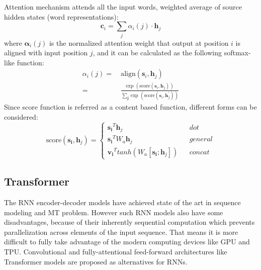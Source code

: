 Attention mechanism attends all the input words, weighted average of source hidden states (word representations):
\[ \bm{c}_i = \sum_{j} {\alpha}_i(j)\cdot  \bm{h}_j \]
where $\bm{\alpha}_i(j)$ is the normalized attention weight that output at position $i$ is aligned with input position $j$, and it can be calculated as the following softmax-like function:
\begin{align}
{\alpha}_i(j) = & \ \text{align}(\bm{s}_i, {\bm{h}}_j) \\
= & \ \frac{\text{exp\ }(\text{score}(\bm{s}_i, {\bm{h}}_j))}{\sum_{\bm{j}^{\prime}} \text{exp\ }(\text{score}(\bm{s}_i, {\bm{h}}_j^{\prime}))}
\end{align}
Since score function is referred as a content based function, different forms can be considered:
\begin{equation}
\text{score}(\bm{s_i}, {\bm{h}}_j)=\left\{
\begin{array}{lcl}
{\bm{s_i}}^T {\bm{h}}_j & & dot\\
{\bm{s_i}}^T W_a {\bm{h}}_j & & general\\
{\bm{v_i}}^T tanh(W_a[\bm{s_i}; {\bm{h}}_j]) & & concat
\end{array} \right.
\end{equation}





\subsection{Transformer}

The RNN encoder-decoder models have achieved state of the art in sequence modeling and MT problem. However such RNN models also have some disadvantages, because of their inherently sequential computation which prevents parallelization across elements of the input sequence. That means it is more difficult to fully take advantage of the modern computing devices like GPU and TPU. Convolutional \cite{gehring2017convolutional} and fully-attentional feed-forward architectures like Transformer \cite{vaswani2017attention} models are proposed as alternatives for RNNs. \\

